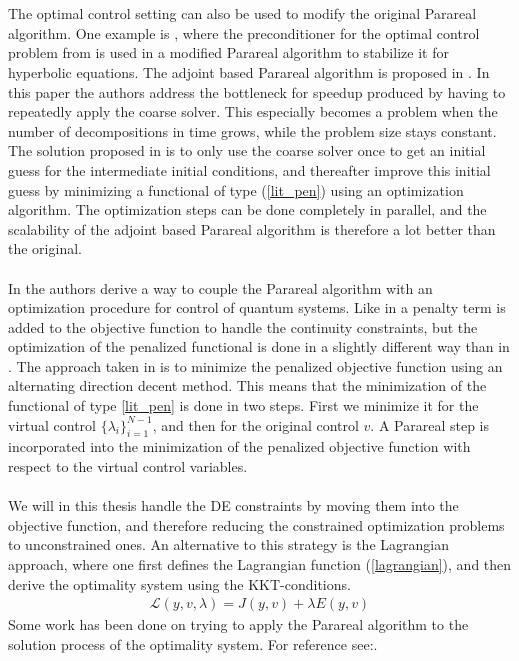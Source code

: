 \\
\\
The optimal control setting can also be used to modify the original Parareal algorithm. One example is \cite{chen2015adjoint}, where the preconditioner for the optimal control problem from \cite{maday2002parareal}  is used in a modified Parareal algorithm to stabilize it for hyperbolic equations. The adjoint based Parareal algorithm is proposed in \cite{rao2014adjoint}. In this paper the authors address the bottleneck for speedup produced by having to repeatedly apply the coarse solver. This especially becomes a problem when the number of decompositions in time grows, while the problem size stays constant. The solution proposed in \cite{rao2014adjoint} is to only use the coarse solver once to get an initial guess for the intermediate initial conditions, and thereafter improve this initial guess by minimizing a functional of type (\ref{lit_pen}) using an optimization algorithm. The optimization steps can be done completely in parallel, and the scalability of the adjoint based Parareal algorithm is therefore a lot better than the original.
\\
\\
In \cite{maday2003parallel,maday2007monotonic} the authors derive a way to couple the Parareal algorithm with an optimization procedure for control of quantum systems. Like in  \cite{maday2002parareal} a penalty term is added to the objective function to handle the continuity constraints, but the optimization of the penalized functional is done in a slightly different way than in \cite{maday2002parareal}. The approach taken in \cite{maday2007monotonic} is to minimize the penalized objective function using an alternating direction decent method. This means that the minimization of the functional of type \ref{lit_pen} is done in two steps. First we minimize it for the virtual control $\{\lambda_i\}_{i=1}^{N-1}$, and then for the original control $v$. A Parareal step is incorporated into the minimization of the penalized objective function with respect to the virtual control variables.
\\
\\
We will in this thesis handle the DE constraints by moving them into the objective function, and therefore reducing the constrained optimization problems to unconstrained ones. An alternative to this strategy is the Lagrangian approach, where one first defines the Lagrangian function (\ref{lagrangian}), and then derive the optimality system using the KKT-conditions. 
\begin{align}
\mathcal{L}(y,v,\lambda) = J(y,v) + \lambda E(y,v) \label{lagrangian}
\end{align}
Some work has been done on trying to apply the Parareal algorithm to the solution process of the optimality system. For reference see:\cite{ulbrich2015preconditioners, mathew2010analysis, carraro2014indirect, pearson2012regularization}.